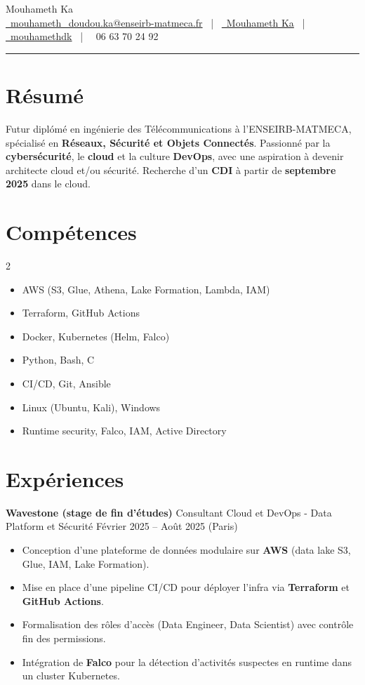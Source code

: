 \documentclass[letterpaper,10pt]{article}
\newcommand{\documentTitle}[2]{
  \begin{center}
    {\Huge\color{accentTitle} #1}\\
    \vspace{6pt}
    \href{mailto:#2}{\faEnvelope\ #2} ~|~
    \href{https://linkedin.com/in/mouhameth-ka-aaa3a7203}{\faLinkedin\ Mouhameth Ka} ~|~
    \href{https://github.com/mouhamethdk}{\faGithub\ mouhamethdk} ~|~
    \faPhone\ 06 63 70 24 92
    \vspace{6pt}
    {\color{accentLine} \hrule}
  \end{center}
}
\begin{document}
\documentTitle{Mouhameth Ka}{mouhameth\_doudou.ka@enseirb-matmeca.fr}

\section{R\'esum\'e}
Futur dipl\'om\'e en ing\'enierie des T\'el\'ecommunications \`a l’ENSEIRB-MATMECA, sp\'ecialis\'e en \textbf{R\'eseaux, S\'ecurit\'e et Objets Connect\'es}. Passionn\'e par la \textbf{cybers\'ecurit\'e}, le \textbf{cloud} et la culture \textbf{DevOps}, avec une aspiration \`a devenir architecte cloud et/ou s\'ecurit\'e. Recherche d’un \textbf{CDI} \`a partir de \textbf{septembre 2025 }dans le cloud.

\section{Comp\'etences}
\begin{multicols}{2}
\begin{itemize}[itemsep=-1px, parsep=1pt, leftmargin=75pt]
\item[\textbf{Cloud}] AWS (S3, Glue, Athena, Lake Formation, Lambda, IAM)
\item[\textbf{Infrastructure as Code}] Terraform, GitHub Actions
\item[\textbf{Conteneurisation}] Docker, Kubernetes (Helm, Falco)
\item[\textbf{Langages}] Python, Bash, C
\item[\textbf{Automatisation}] CI/CD, Git, Ansible
\item[\textbf{OS}] Linux (Ubuntu, Kali), Windows
\item[\textbf{S\'ecurit\'e}] Runtime security, Falco, IAM, Active Directory
\end{itemize}
\end{multicols}

\section{Exp\'eriences}

\textbf{Wavestone (stage de fin d’\'etudes)} Consultant Cloud et DevOps - Data Platform et S\'ecurit\'e \hfill F\'evrier 2025 -- Ao\^ut 2025 (Paris)
\begin{itemize}[leftmargin=0.15in]
\item Conception d'une plateforme de donn\'ees modulaire sur \textbf{AWS} (data lake S3, Glue, IAM, Lake Formation).
\item Mise en place d'une pipeline CI/CD pour d\'eployer l'infra via \textbf{Terraform} et \textbf{GitHub Actions}.
\item Formalisation des r\^oles d’acc\`es (Data Engineer, Data Scientist) avec contr\^ole fin des permissions.
\item Int\'egration de \textbf{Falco} pour la d\'etection d’activit\'es suspectes en runtime dans un cluster Kubernetes.
\end{itemize}
\end{document}

